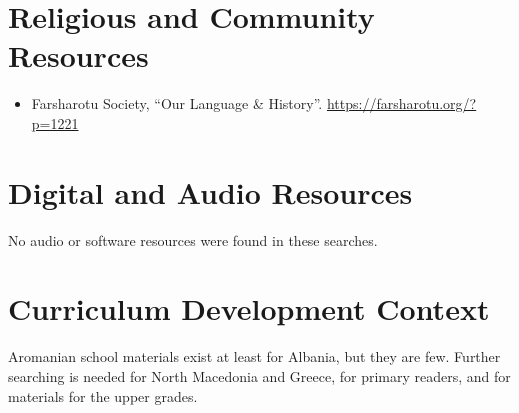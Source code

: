 \documentclass[12pt]{article}
\begin{document}
\section{Religious and Community Resources}
\begin{itemize}
\item Farsharotu Society, ``Our Language \& History''. \url{https://farsharotu.org/?p=1221}
\end{itemize}

\section{Digital and Audio Resources}
No audio or software resources were found in these searches.

\section{Curriculum Development Context}
Aromanian school materials exist at least for Albania, but they are few. Further searching is needed for North Macedonia and Greece, for primary readers, and for materials for the upper grades.
\end{document}
